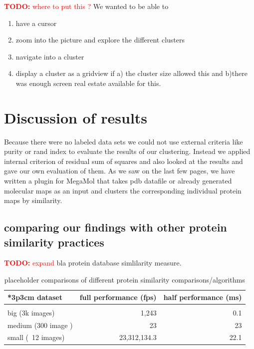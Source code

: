 \documentclass[journal]{vgtc}       %
\newcommand{\todo}[1]{\textcolor{red}{\textbf{TODO:} #1}}
\begin{document}
\todo{where to put this ?}
We wanted to be able to 
\begin{enumerate}
  \item have a cursor 
  \item zoom into the picture and  explore the different clusters
  \item navigate into a cluster
  \item display a cluster as a gridview if a) the cluster size allowed this and b)there was enough screen real estate available for this.
  
\end{enumerate}


\section{Discussion of results}
Because there were no labeled data sets we could not use external criteria like purity or rand index to evaluate the results of our clustering. Instead we applied internal criterion of residual sum of squares and also looked at the results and gave our own evaluation of them.
As we saw on the last few pages, we have written a plugin for MegaMol that takes pdb datafile or already generated molecular maps as an input and clusters  the corresponding individual protein maps by similarity.


\subsection{comparing our findings with other protein similarity practices}\label{subsec:comparison}
\todo{expand} bla \cite{3dsurfer} protein database simlilarity measure.


\begin{table}
  \caption{
  \label{tab:perf} placeholder comparisons of different protein similarity comparisons/algorithms}
  \centering
  \vspace{0.3em}
  \begin{tabular}{lrr}{*{3}{p{3cm}}}
  dataset & full performance (fps) & half performance (ms)\\ \hline\\[-0.4em]
  big (3k images) & 1,243 & 0.1 \\
  medium (300 image ) & 23 & 23 \\
  small (~12 images) & 23,312,134.3 & 22.1 \\
  \end{tabular}
  \end{table}
\end{document}

